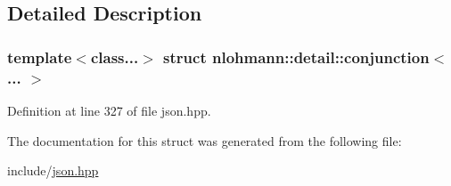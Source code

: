 \subsection{Detailed Description}
\subsubsection*{template$<$class...$>$\newline
struct nlohmann\+::detail\+::conjunction$<$... $>$}



Definition at line 327 of file json.\+hpp.



The documentation for this struct was generated from the following file\+:\begin{DoxyCompactItemize}
\item 
include/\hyperlink{json_8hpp}{json.\+hpp}\end{DoxyCompactItemize}

